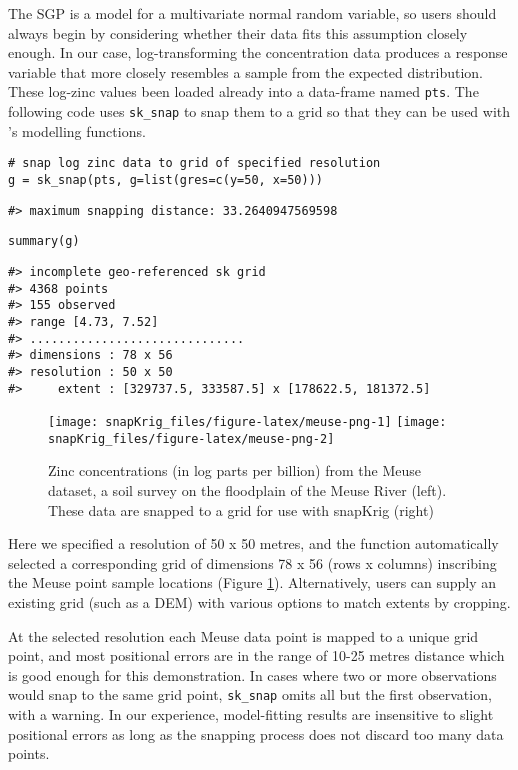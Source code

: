 The SGP is a model for a multivariate normal random variable, so users should always begin by considering whether their data fits this assumption closely enough. In our case, log-transforming the concentration data produces a response variable that more closely resembles a sample from the expected distribution. These log-zinc values been loaded already into a data-frame named \texttt{pts}. The following code uses \texttt{sk\_snap} to snap them to a grid so that they can be used with 's modelling functions.

\begin{verbatim}
# snap log zinc data to grid of specified resolution
g = sk_snap(pts, g=list(gres=c(y=50, x=50)))
\end{verbatim}

\begin{verbatim}
#> maximum snapping distance: 33.2640947569598
\end{verbatim}

\begin{verbatim}
summary(g)
\end{verbatim}

\begin{verbatim}
#> incomplete geo-referenced sk grid
#> 4368 points
#> 155 observed
#> range [4.73, 7.52]
#> ..............................
#> dimensions : 78 x 56
#> resolution : 50 x 50
#>     extent : [329737.5, 333587.5] x [178622.5, 181372.5]
\end{verbatim}

\begin{figure}
\texttt{[image: snapKrig\_files/figure-latex/meuse-png-1]} \texttt{[image: snapKrig\_files/figure-latex/meuse-png-2]} \caption{Zinc concentrations (in log parts per billion) from the Meuse dataset, a soil survey on the floodplain of the Meuse River (left). These data are snapped to a grid for use with snapKrig (right)}\label{fig:meuse-png}
\end{figure}

Here we specified a resolution of 50 x 50 metres, and the function automatically selected a corresponding grid of dimensions 78 x 56 (rows x columns) inscribing the Meuse point sample locations (Figure \ref{fig:meuse-png}). Alternatively, users can supply an existing grid (such as a DEM) with various options to match extents by cropping.

At the selected resolution each Meuse data point is mapped to a unique grid point, and most positional errors are in the range of 10-25 metres distance which is good enough for this demonstration. In cases where two or more observations would snap to the same grid point, \texttt{sk\_snap} omits all but the first observation, with a warning. In our experience, model-fitting results are insensitive to slight positional errors as long as the snapping process does not discard too many data points.

